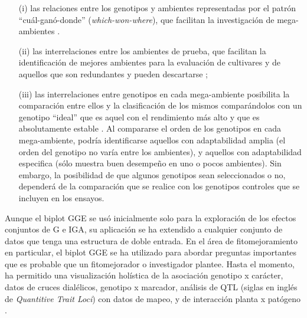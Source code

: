 \begin{itemize}
\item[(i)] las relaciones entre los genotipos y ambientes representadas por el patrón ``cuál-ganó-donde'' (\emph{which-won-where}), que facilitan la investigación de mega-ambientes \citep{GauchZobel1997}.

\item[(ii)] las interrelaciones entre los ambientes de prueba, que facilitan la identificación de mejores ambientes para la evaluación de cultivares \citep{Cooperetal1997} y de aquellos que son redundantes y pueden descartarse \citep{YanRajcan2002};

\item[(iii)] las interrelaciones entre genotipos en cada mega-ambiente posibilita la comparación entre ellos y la clasificación de los mismos comparándolos con un genotipo ``ideal'' que es aquel con el rendimiento más alto y que es absolutamente estable \citep{Yanetal2001}.  Al compararse el orden de los genotipos en cada mega-ambiente, podría identificarse aquellos con adaptabilidad amplia (el orden del genotipo no varía entre los ambientes), y aquellos con adaptabilidad especifica (sólo muestra buen desempeño en uno o pocos ambientes). Sin embargo, la posibilidad de que algunos genotipos sean seleccionados o no, dependerá de la comparación que se realice con los genotipos controles que se incluyen en los ensayos.
\end{itemize}

Aunque el biplot GGE se usó inicialmente solo para la exploración de los efectos conjuntos de G e IGA, su aplicación se ha extendido a cualquier conjunto de datos que tenga una estructura de doble entrada. En el área de fitomejoramiento en particular, el biplot GGE se ha utilizado para abordar preguntas importantes que es probable que un fitomejorador o investigador plantee. Hasta el momento, ha permitido una visualización holística de la asociación genotipo x carácter, datos de cruces dialélicos, genotipo x marcador, análisis de QTL (siglas en inglés de \emph{Quantitive Trait Loci}) con datos de mapeo, y de interacción planta x patógeno \citep{YanKang2003, Singhetal2020, Hernandezetal2020, Adueral2021}.


